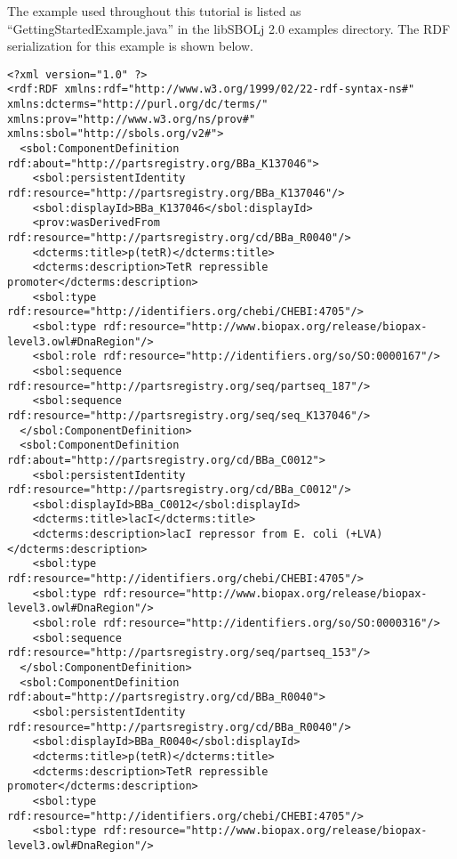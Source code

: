 The example used throughout this tutorial is listed as
``GettingStartedExample.java'' in the libSBOLj 2.0 examples
directory. The RDF serialization for this example is shown below.  


\begin{minipage}{0.95\textwidth} 
\begin{lstlisting}
<?xml version="1.0" ?>
<rdf:RDF xmlns:rdf="http://www.w3.org/1999/02/22-rdf-syntax-ns#" xmlns:dcterms="http://purl.org/dc/terms/" xmlns:prov="http://www.w3.org/ns/prov#" xmlns:sbol="http://sbols.org/v2#">
  <sbol:ComponentDefinition rdf:about="http://partsregistry.org/BBa_K137046">
    <sbol:persistentIdentity rdf:resource="http://partsregistry.org/BBa_K137046"/>
    <sbol:displayId>BBa_K137046</sbol:displayId>
    <prov:wasDerivedFrom rdf:resource="http://partsregistry.org/cd/BBa_R0040"/>
    <dcterms:title>p(tetR)</dcterms:title>
    <dcterms:description>TetR repressible promoter</dcterms:description>
    <sbol:type rdf:resource="http://identifiers.org/chebi/CHEBI:4705"/>
    <sbol:type rdf:resource="http://www.biopax.org/release/biopax-level3.owl#DnaRegion"/>
    <sbol:role rdf:resource="http://identifiers.org/so/SO:0000167"/>
    <sbol:sequence rdf:resource="http://partsregistry.org/seq/partseq_187"/>
    <sbol:sequence rdf:resource="http://partsregistry.org/seq/seq_K137046"/>
  </sbol:ComponentDefinition>
  <sbol:ComponentDefinition rdf:about="http://partsregistry.org/cd/BBa_C0012">
    <sbol:persistentIdentity rdf:resource="http://partsregistry.org/cd/BBa_C0012"/>
    <sbol:displayId>BBa_C0012</sbol:displayId>
    <dcterms:title>lacI</dcterms:title>
    <dcterms:description>lacI repressor from E. coli (+LVA)</dcterms:description>
    <sbol:type rdf:resource="http://identifiers.org/chebi/CHEBI:4705"/>
    <sbol:type rdf:resource="http://www.biopax.org/release/biopax-level3.owl#DnaRegion"/>
    <sbol:role rdf:resource="http://identifiers.org/so/SO:0000316"/>
    <sbol:sequence rdf:resource="http://partsregistry.org/seq/partseq_153"/>
  </sbol:ComponentDefinition>
  <sbol:ComponentDefinition rdf:about="http://partsregistry.org/cd/BBa_R0040">
    <sbol:persistentIdentity rdf:resource="http://partsregistry.org/cd/BBa_R0040"/>
    <sbol:displayId>BBa_R0040</sbol:displayId>
    <dcterms:title>p(tetR)</dcterms:title>
    <dcterms:description>TetR repressible promoter</dcterms:description>
    <sbol:type rdf:resource="http://identifiers.org/chebi/CHEBI:4705"/>
    <sbol:type rdf:resource="http://www.biopax.org/release/biopax-level3.owl#DnaRegion"/>

\end{lstlisting}
\end{minipage}
